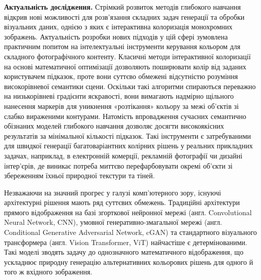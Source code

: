 \intro

    \textbf{Актуальність дослідження.}
        Стрімкий розвиток методів глибокого навчання відкрив нові можливості для розв'язання складних задач генерації та обробки візуальних даних,
        однією з яких є інтерактивна колоризація монохромних зображень.
        Актуальність розробки нових підходів у цій сфері зумовлена практичним попитом на інтелектуальні інструменти керування кольором для складного фотографічного контенту.
        Класичні методи інтерактивної колоризації на основі математичної оптимізації дозволяють поширювати колір від заданих користувачем підказок,
        проте вони суттєво обмежені відсутністю розуміння високорівневої семантики сцени. 
        Оскільки такі алгоритми спираються переважно на низькорівневі градієнти яскравості, вони вимагають надмірно щільного нанесення маркерів для уникнення «розтікання» кольору за межі об'єктів зі слабко вираженими контурами.
        Натомість впровадження сучасних семантично обізнаних моделей глибокого навчання дозволяє досягти високоякісних результатів за мінімальної кількості підказок.
        Такі інструменти є затребуваними для швидкої генерації багатоваріантних колірних рішень у реальних прикладних задачах, наприклад, в електронній комерції, рекламній фотографії чи дизайні інтер'єрів, де виникає потреба миттєво перефарбовувати окремі об'єкти зі збереженням їхньої природної текстури та тіней.

        Незважаючи на значний прогрес у галузі комп'ютерного зору, існуючі архітектурні рішення мають ряд суттєвих обмежень.
        Традиційні архітектури прямого відображення на базі згорткової нейронної мережі (англ. Convolutional Neural Network, CNN),
        умовної генеративно-змагальної мережі (англ. Conditional Generative Adversarial Network, cGAN) та стандартного візуального трансформера (англ. Vision Transformer, ViT) найчастіше є детермінованими.
        Такі моделі зводять задачу до однозначного математичного відображення, що ускладнює природну генерацію альтернативних кольорових рішень для одного й того ж вхідного зображення.
        
